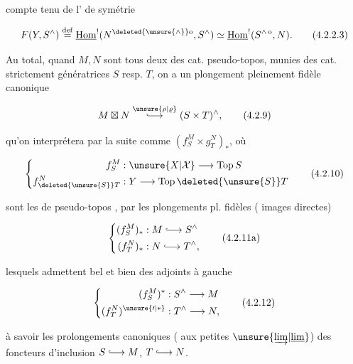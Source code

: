 compte tenu de l' de symétrie

\[
F(Y,S^{\wedge})\overset{\mathrm{def}}{=}
\underline{\operatorname{Hom}}^{!}(N^{\deleted{\unsure{\wedge}}\mathrm{o}}, S^{\wedge})\simeq
\underline{\operatorname{Hom}}^{!}(S^{\wedge\,\mathrm{o}},N).
\tag*{(4.2.2.3)}
\]

Au total, quand $M,N$ sont tous deux des cat. pseudo-topos, munies des cat. strictement génératrices $S$ resp. $T$, on a un plongement pleinement fidèle canonique

\[
M\boxtimes N\overset{\unsure{\rho|\varrho}}{\lhook\joinrel\longrightarrow}(S\times T)^{\wedge},
\tag*{(4.2.9)}
\]

qu'on interprétera par la suite comme $(f^{M}_{S}\times g^{N}_{T})_{*}$, où 

\[
\left\{\begin{aligned}
f^{M}_{S}&: \unsure{X|\mathcal X}\longrightarrow\operatorname{Top} S\\
f^{N}_{\deleted{\unsure{S}}T}&: Y\longrightarrow\operatorname{Top}\deleted{\unsure{S}}T
\end{aligned}\right.
\tag*{(4.2.10)}
\]

sont les  de pseudo-topos , par les plongements pl. fidèles ( images directes)

\[
\left\{\begin{aligned}
(f^{M}_{S})_{*}&:M\lhook\joinrel\longrightarrow S^{\wedge}\\
(f^{N}_{T})_{*}&:N\lhook\joinrel\longrightarrow T^{\wedge},
\end{aligned}\right.
\tag*{(4.2.11a)}
\]

lesquels admettent bel et bien des adjoints à gauche

\[
\left\{\begin{aligned}
(f^{M}_{S})^{*}&: S^{\wedge}\longrightarrow M\\
(f^{N}_{T})^{\unsure{\prime|*}}&: T^{\wedge}\longrightarrow N,
\end{aligned}\right.
\tag*{(4.2.12)}
\]

à savoir les prolongements canoniques ( aux petites $\unsure{\underrightarrow{\lim}|\underline{\lim}}$) des foncteurs d'inclusion $S\lhook\joinrel\longrightarrow M$, $T\lhook\joinrel\longrightarrow N$.

